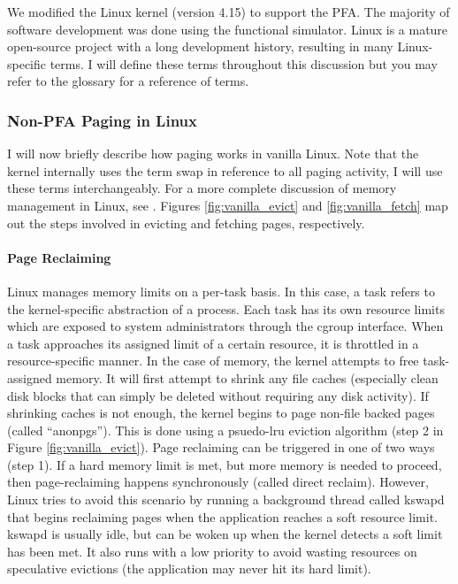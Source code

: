 We modified the Linux kernel (version 4.15\cite{linux}) to support the PFA. The
majority of software development was done using the functional simulator. Linux
is a mature open-source project with a long development history, resulting in
many Linux-specific terms. I will define these terms throughout this discussion
but you may refer to the glossary for a reference of terms.

\subsubsection{Non-PFA Paging in Linux} \label{sec:vanillaLinux}
I will now briefly describe how paging works in vanilla Linux. Note that the
kernel internally uses the term \gls{swap} in reference to all paging activity,
I will use these terms interchangeably. For a more complete discussion of
memory management in Linux, see \cite{linuxBook}. Figures
\ref{fig:vanilla_evict} and \ref{fig:vanilla_fetch} map out the steps involved
in evicting and fetching pages, respectively.

\paragraph{Page Reclaiming}
Linux manages memory limits on a per-task basis. In this case, a \gls{task}
refers to the kernel-specific abstraction of a process. Each task has its own
resource limits which are exposed to system administrators through the
\gls{cgroup} interface. When a task approaches its assigned limit of a certain
resource, it is throttled in a resource-specific manner. In the case of memory,
the kernel attempts to free task-assigned memory. It will first attempt to
shrink any file caches (especially clean disk blocks that can simply be deleted
without requiring any disk activity). If shrinking caches is not enough, the
kernel begins to page non-file backed pages (called ``\glspl{anonpg}''). This
is done using a psuedo-\gls{lru} eviction algorithm (step 2 in Figure
\ref{fig:vanilla_evict}). Page reclaiming can be triggered
in one of two ways (step 1). If a hard memory limit is met, but more memory is needed to
proceed, then page-reclaiming happens synchronously (called direct reclaim).
However, Linux tries to avoid this scenario by running a background thread
called \gls{kswapd} that begins reclaiming pages when the application reaches a
soft resource limit. \Gls{kswapd} is usually idle, but can be woken up when the
kernel detects a soft limit has been met. It also runs with a low priority to
avoid wasting resources on speculative evictions (the application may never hit
its hard limit).

